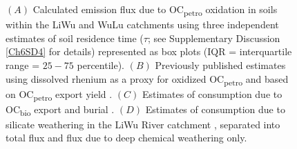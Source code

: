 \begin{figure}[p]
	\caption[ source and sink flux estimates from various processes in the Central Range]{$(A)$ Calculated  emission flux due to OC\textsubscript{petro} oxidation in soils within the LiWu and WuLu catchments using three independent estimates of soil residence time ($\tau$; see Supplementary Discussion \ref{Ch6SD4} for details) represented as box plots (IQR = interquartile range = $25 - 75$ percentile). $(B)$ Previously published estimates using dissolved rhenium as a proxy for oxidized OC\textsubscript{petro} \citep[orange bars;][]{Hilton:2014dh} and based on OC\textsubscript{petro} export yield \citep[black arrow;][]{Hilton:2011jw}. $(C)$ Estimates of  consumption due to OC\textsubscript{bio} export and burial \citep[mean $\pm 1$ std. dev.;][]{Hilton:2012dt}. $(D)$ Estimates of  consumption due to silicate weathering in the LiWu River catchment \citep{Calmels:2011gv}, separated into total flux and flux due to deep chemical weathering only.}

\end{figure}
